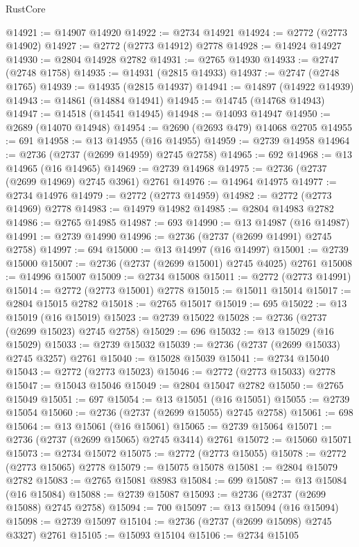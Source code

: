 \begin{lexlean}{RustCore}
\begin{coremodule}
@14921 := @14907 @14920
@14922 := @2734 @14921
@14924 := @2772 (@2773 @14902)
@14927 := @2772 (@2773 @14912) @2778
@14928 := @14924 @14927
@14930 := @2804 @14928 @2782
@14931 := @2765 @14930
@14933 := @2747 (@2748 @1758)
@14935 := @14931 (@2815 @14933)
@14937 := @2747 (@2748 @1765)
@14939 := @14935 (@2815 @14937)
@14941 := @14897 (@14922 @14939)
@14943 := @14861 (@14884 @14941)
@14945 := @14745 (@14768 @14943)
@14947 := @14518 (@14541 @14945)
@14948 := @14093 @14947
@14950 := @2689 (@14070 @14948)
@14954 := @2690 (@2693 @479) @14068 @2705
@14955 := 691
@14958 := @13 @14955 (@16 @14955)
@14959 := @2739 @14958
@14964 := @2736 (@2737 (@2699 @14959) @2745 @2758)
@14965 := 692
@14968 := @13 @14965 (@16 @14965)
@14969 := @2739 @14968
@14975 := @2736 (@2737 (@2699 @14969) @2745 @3961) @2761
@14976 := @14964 @14975
@14977 := @2734 @14976
@14979 := @2772 (@2773 @14959)
@14982 := @2772 (@2773 @14969) @2778
@14983 := @14979 @14982
@14985 := @2804 @14983 @2782
@14986 := @2765 @14985
@14987 := 693
@14990 := @13 @14987 (@16 @14987)
@14991 := @2739 @14990
@14996 := @2736 (@2737 (@2699 @14991) @2745 @2758)
@14997 := 694
@15000 := @13 @14997 (@16 @14997)
@15001 := @2739 @15000
@15007 := @2736 (@2737 (@2699 @15001) @2745 @4025) @2761
@15008 := @14996 @15007
@15009 := @2734 @15008
@15011 := @2772 (@2773 @14991)
@15014 := @2772 (@2773 @15001) @2778
@15015 := @15011 @15014
@15017 := @2804 @15015 @2782
@15018 := @2765 @15017
@15019 := 695
@15022 := @13 @15019 (@16 @15019)
@15023 := @2739 @15022
@15028 := @2736 (@2737 (@2699 @15023) @2745 @2758)
@15029 := 696
@15032 := @13 @15029 (@16 @15029)
@15033 := @2739 @15032
@15039 := @2736 (@2737 (@2699 @15033) @2745 @3257) @2761
@15040 := @15028 @15039
@15041 := @2734 @15040
@15043 := @2772 (@2773 @15023)
@15046 := @2772 (@2773 @15033) @2778
@15047 := @15043 @15046
@15049 := @2804 @15047 @2782
@15050 := @2765 @15049
@15051 := 697
@15054 := @13 @15051 (@16 @15051)
@15055 := @2739 @15054
@15060 := @2736 (@2737 (@2699 @15055) @2745 @2758)
@15061 := 698
@15064 := @13 @15061 (@16 @15061)
@15065 := @2739 @15064
@15071 := @2736 (@2737 (@2699 @15065) @2745 @3414) @2761
@15072 := @15060 @15071
@15073 := @2734 @15072
@15075 := @2772 (@2773 @15055)
@15078 := @2772 (@2773 @15065) @2778
@15079 := @15075 @15078
@15081 := @2804 @15079 @2782
@15083 := @2765 @15081 @8983
@15084 := 699
@15087 := @13 @15084 (@16 @15084)
@15088 := @2739 @15087
@15093 := @2736 (@2737 (@2699 @15088) @2745 @2758)
@15094 := 700
@15097 := @13 @15094 (@16 @15094)
@15098 := @2739 @15097
@15104 := @2736 (@2737 (@2699 @15098) @2745 @3327) @2761
@15105 := @15093 @15104
@15106 := @2734 @15105

\end{coremodule}
\end{lexlean}
